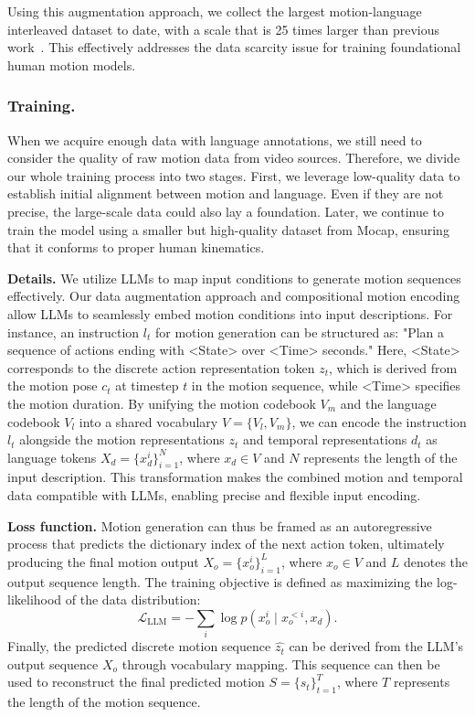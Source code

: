 Using this augmentation approach, we collect the largest motion-language interleaved dataset to date, with a scale that is 25 times larger than previous work~\cite{mao2024learning}. This effectively addresses the data scarcity issue for training foundational human motion models.

\subsubsection{Training.}
When we acquire enough data with language annotations, we still need to consider the quality of raw motion data from video sources.
Therefore, we divide our whole training process into two stages. First, we leverage low-quality data to establish initial alignment between motion and language. Even if they are not precise, the large-scale data could also lay a foundation. 
Later, we continue to train the model using a smaller but high-quality dataset from Mocap, ensuring that it conforms to proper human kinematics.




\textbf{Details.}
We utilize LLMs to map input conditions to generate motion sequences effectively. Our data augmentation approach and compositional motion encoding allow LLMs to seamlessly embed motion conditions into input descriptions.
For instance, an instruction \( l_t \) for motion generation can be structured as: "Plan a sequence of actions ending with <State> over <Time> seconds." Here, <State> corresponds to the discrete action representation token \( z_t \), which is derived from the motion pose \( c_t \) at timestep \( t \) in the motion sequence, while <Time> specifies the motion duration. By unifying the motion codebook \( V_m \) and the language codebook \( V_l \) into a shared vocabulary \( V = \{V_l, V_m\} \), we can encode the instruction \( l_t \) alongside the motion representations \( z_t \) and temporal representations \( d_t \) as language tokens \( X_d = \{x_d^i\}_{i=1}^N \), where \( x_d \in V \) and \( N \) represents the length of the input description. This transformation makes the combined motion and temporal data compatible with LLMs, enabling precise and flexible input encoding.



\textbf{Loss function.}
Motion generation can thus be framed as an autoregressive process that predicts the dictionary index of the next action token, ultimately producing the final motion output \( X_o = \{x_o^i\}_{i=1}^L \), where \( x_o \in V \) and \( L \) denotes the output sequence length. The training objective is defined as maximizing the log-likelihood of the data distribution:
\begin{equation} 
\mathcal{L}_\text{LLM} = -\sum_{i} \log p(x_o^i \mid x_o^{<i}, x_d).
\end{equation}
Finally, the predicted discrete motion sequence \( \hat{z_t} \) can be derived from the LLM's output sequence \( X_o \) through vocabulary mapping. This sequence can then be used to reconstruct the final predicted motion \( S = \{s_t\}_{t=1}^{T} \), where \( T \) represents the length of the motion sequence.


